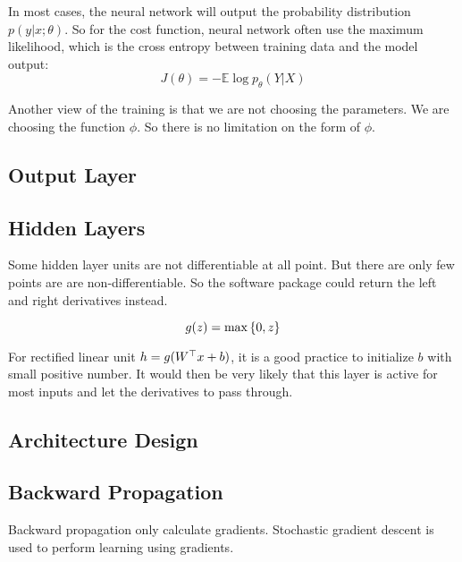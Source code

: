 In most cases, the neural network will output the probability distribution $p(y|x;\theta)$. So for the cost function, neural network often use the maximum likelihood, which is the cross entropy between training data and the model output:
\begin{equation}
    J(\theta) = - \mathbb{E} \log p_\theta (Y|X)
\end{equation}

Another view of the training is that we are not choosing the parameters. We are choosing the function $\phi$. So there is no limitation on the form of $\phi$.


\subsection{Output Layer}


\subsection{Hidden Layers}

Some hidden layer units are not differentiable at all point. But there are only few points are are non-differentiable. So the software package could return the left and right derivatives instead.


\begin{definition}
    \begin{equation}
        g(z) = \max \set{0, z}
    \end{equation}
\end{definition}

For rectified linear unit $h = g({W}^\top x + b)$, it is a good practice to initialize $b$ with small positive number. It would then be very likely that this layer is active for most inputs and let the derivatives to pass through.


\subsection{Architecture Design}


\subsection{Backward Propagation}

Backward propagation only calculate gradients. Stochastic gradient descent is used to perform learning using gradients.



